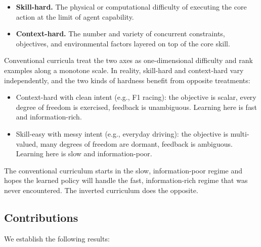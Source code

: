\documentclass[11pt,twocolumn,a4paper]{article}
\begin{document}
\begin{itemize}[leftmargin=*,itemsep=2pt]
\item \textbf{Skill-hard.} The physical or computational difficulty of executing the core action at the limit of agent capability.
\item \textbf{Context-hard.} The number and variety of concurrent constraints, objectives, and environmental factors layered on top of the core skill.
\end{itemize}

Conventional curricula treat the two axes as one-dimensional difficulty and rank examples along a monotone scale. In reality, skill-hard and context-hard vary independently, and the two kinds of hardness benefit from opposite treatments:

\begin{itemize}[leftmargin=*,itemsep=2pt]
\item Context-hard with clean intent (e.g., F1 racing): the objective is scalar, every degree of freedom is exercised, feedback is unambiguous. Learning here is fast and information-rich.
\item Skill-easy with messy intent (e.g., everyday driving): the objective is multi-valued, many degrees of freedom are dormant, feedback is ambiguous. Learning here is slow and information-poor.
\end{itemize}

The conventional curriculum starts in the slow, information-poor regime and hopes the learned policy will handle the fast, information-rich regime that was never encountered. The inverted curriculum does the opposite.

\subsection{Contributions}

We establish the following results:
\end{document}
